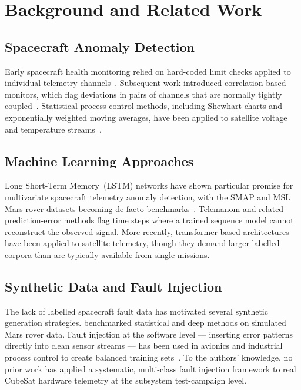 \documentclass[conference]{IEEEtran}
\begin{document}
\section{Background and Related Work}
\label{sec:background}

\subsection{Spacecraft Anomaly Detection}

Early spacecraft health monitoring relied on hard-coded limit checks
applied to individual telemetry channels~\cite{iverson2008general}.
Subsequent work introduced correlation-based monitors, which flag
deviations in pairs of channels that are normally tightly
coupled~\cite{srivastava2005discovering}.  Statistical process control
methods, including Shewhart charts and exponentially weighted moving
averages, have been applied to satellite voltage and temperature
streams~\cite{susto2018multivariate}.

\subsection{Machine Learning Approaches}

Long Short-Term Memory~(LSTM) networks have shown particular promise
for multivariate spacecraft telemetry anomaly detection, with the
SMAP and MSL Mars rover datasets becoming de-facto
benchmarks~\cite{hundman2018detecting}.  Telemanom and related
prediction-error methods flag time steps where a trained sequence
model cannot reconstruct the observed signal.  More recently,
transformer-based architectures~\cite{xu2021anomaly} have been
applied to satellite telemetry, though they demand larger labelled
corpora than are typically available from single missions.

\subsection{Synthetic Data and Fault Injection}

The lack of labelled spacecraft fault data has motivated several
synthetic generation strategies.  \cite{kerner2020comparison}
benchmarked statistical and deep methods on simulated Mars rover
data.  Fault injection at the software level — inserting error
patterns directly into clean sensor streams — has been used in
avionics and industrial process control to create balanced training
sets~\cite{natschlaeger2010fault}.  To the authors' knowledge, no
prior work has applied a systematic, multi-class fault injection
framework to real CubeSat hardware telemetry at the subsystem
test-campaign level.
\end{document}
